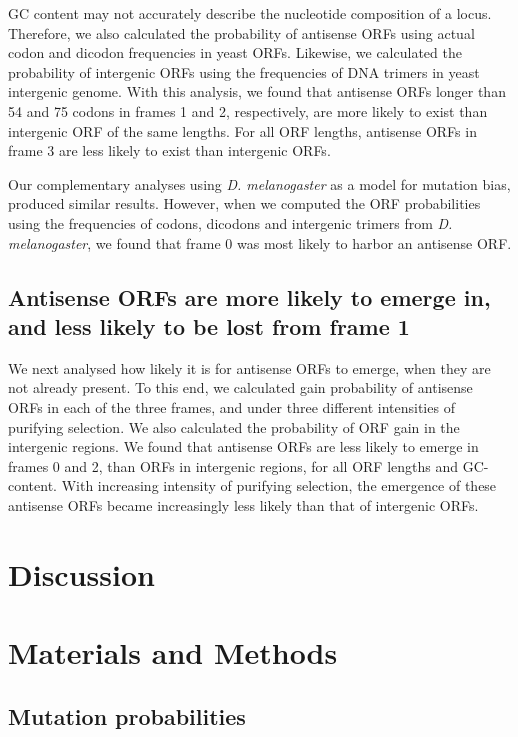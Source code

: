 \documentclass[12pt,a4paper]{article}
\begin{document}
GC content may not accurately describe the nucleotide composition of a locus. Therefore, we also calculated the probability of antisense ORFs using actual codon and dicodon frequencies in yeast ORFs. Likewise, we calculated the probability of intergenic ORFs using the frequencies of DNA trimers in yeast intergenic genome. With this analysis, we found that antisense ORFs longer than 54 and 75 codons in frames 1 and 2, respectively, are more likely to exist than intergenic ORF of the same lengths. For all ORF lengths, antisense ORFs in frame 3 are less likely to exist than intergenic ORFs. 

Our complementary analyses using \textit{D. melanogaster} as a model for mutation bias, produced similar results. However, when we computed the ORF probabilities using the frequencies of codons, dicodons and intergenic trimers from  \textit{D. melanogaster}, we found that frame 0 was most likely to harbor an antisense ORF. 

\subsection*{Antisense ORFs are more likely to emerge in, and less likely to be lost from frame 1}

We next analysed how likely it is for antisense ORFs to emerge, when they are not already present. To this end, we calculated gain probability of antisense ORFs in each of the three frames, and under three different intensities of purifying selection. We also calculated the probability of ORF gain in the intergenic regions. We found that antisense ORFs are less likely to emerge in frames 0 and 2, than ORFs in intergenic regions, for all ORF lengths and GC-content. With increasing intensity of purifying selection, the emergence of these antisense ORFs became increasingly less likely than that of intergenic ORFs.

\section*{Discussion} 


\section*{Materials and Methods}

\subsection{Mutation probabilities}
\end{document}
